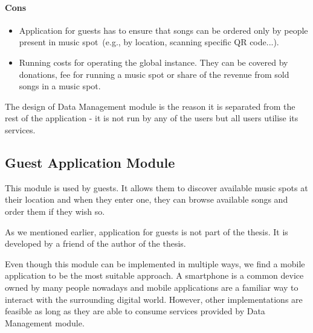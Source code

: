\paragraph{Cons}
\begin{itemize}
\item Application for guests has to ensure that songs can be ordered only by people present in music spot~(e.g., by location, scanning specific QR code...).
\item Running costs for operating the global instance. They can be covered by donations, fee for running a music spot or share of the revenue from sold songs in a music spot.
\end{itemize}
\par
The design of Data Management module is the reason it is separated from the rest of the application - it is not run by any of the users but all users utilise its services.

\subsection{Guest Application Module}

This module is used by guests. It allows them to discover available music spots at their location and when they enter one, they can browse available songs and order them if they wish so.
\par
As we mentioned earlier, application for guests is not part of the thesis. It is developed by a friend of the author of the thesis.
\par
Even though this module can be implemented in multiple ways, we find a mobile application to be the most suitable approach. A smartphone is a common device owned by many people nowadays and mobile applications are a familiar way to interact with the surrounding digital world. However, other implementations are feasible as long as they are able to consume services provided by Data Management module.























